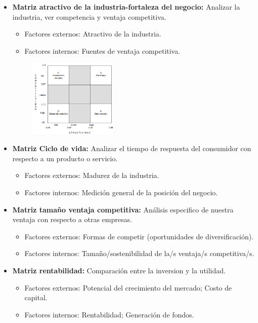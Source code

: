 \documentclass{templateNote}
\begin{document}
\begin{itemize}
\begin{itemize}
\begin{itemize}
\begin{figure}[H]
                \end{figure}
            \end{itemize}
            \item \textbf{Matriz atractivo de la industria-fortaleza del negocio:} Analizar la industria, ver competencia y ventaja competitiva.
            \begin{itemize}
                \item Factores externos: Atractivo de la industria.
                \item Factores internos: Fuentes de ventaja competitiva.
            \end{itemize}
            \begin{figure}[H]
                \centering
                \includegraphics[width=0.4\textwidth]{img/matriz_atractivo.png}
            \end{figure}
            \item \textbf{Matriz Ciclo de vida:} Analizar el tiempo de respuesta del consumidor con respecto a un producto o servicio.
            \begin{itemize}
                \item Factores externos: Madurez de la industria.
                \item Factores internos: Medición general de la posición del negocio.
            \end{itemize}
            \item \textbf{Matriz tamaño ventaja competitiva:} Análisis especifico de nuestra ventaja con respecto a otras empresas.
            \begin{itemize}
                \item Factores externos: Formas de competir (oportunidades de diversificación).
                \item Factores internos: Tamaño/sostenibilidad de la/s ventaja/s competitiva/s.
            \end{itemize}
            \item \textbf{Matriz rentabilidad:} Comparación entre la inversion y la utilidad. 
            \begin{itemize}
                \item Factores externos: Potencial del crecimiento del mercado; Costo de capital.
                \item Factores internos: Rentabilidad; Generación de fondos.
            \end{itemize}
        \end{itemize}
    \end{itemize}
\end{document}
